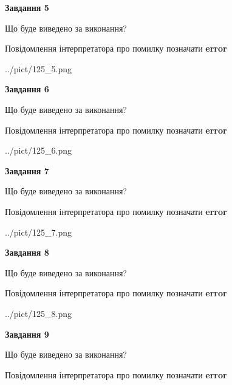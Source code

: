 \documentclass[11pt, ukrainian]{article}
\begin{document}
{\begin {large}
{\begin {center}\textbf{Завдання 5}\end {center}}\par
Що буде виведено за виконання? \par
Повідомлення інтерпретатора про помилку позначати \textbf{error}

\begin{center}
	{../pict/125_5.png}
\end{center}
\newpage

{\begin {center}\textbf{Завдання 6}\end {center}}\par
Що буде виведено за виконання? \par
Повідомлення інтерпретатора про помилку позначати \textbf{error}

\begin{center}
	{../pict/125_6.png}
\end{center}
\newpage

{\begin {center}\textbf{Завдання 7}\end {center}}\par
Що буде виведено за виконання? \par
Повідомлення інтерпретатора про помилку позначати \textbf{error}

\begin{center}
	{../pict/125_7.png}
\end{center}
\newpage

{\begin {center}\textbf{Завдання 8}\end {center}}\par
Що буде виведено за виконання? \par
Повідомлення інтерпретатора про помилку позначати \textbf{error}

\begin{center}
	{../pict/125_8.png}
\end{center}
\newpage

{\begin {center}\textbf{Завдання 9}\end {center}}\par
Що буде виведено за виконання? \par
Повідомлення інтерпретатора про помилку позначати \textbf{error}


\end{large}}
\end{document}
